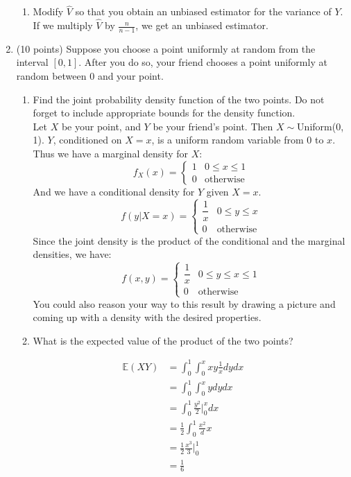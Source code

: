 \documentclass[12pt]{article}
\def\E{{\mathbb E}}
\begin{document}
\begin{enumerate}
\begin{enumerate}
\item Modify $\hat{V}$ so that you obtain an unbiased estimator for the variance of $Y$.\\

If we multiply $\hat{V}$ by $\frac{n}{n-1}$, we get an unbiased estimator.
\end{enumerate}
\pagebreak 

\item (10 points) Suppose you choose a point uniformly at random from the interval $[0, 1]$. After you do so, your friend chooses a point uniformly at random between 0 and your point.
\begin{enumerate}
\item Find the joint probability density function of the two points. Do not forget to include appropriate bounds for the density function.\\

Let $X$ be your point, and $Y$ be your friend's point. Then $X \sim $Uniform(0, 1). $Y$, conditioned on $X = x$, is a uniform random variable from $0$ to $x$. Thus we have a marginal density for $X$:
\[
f_X(x) = \begin{cases}
1 & 0 \leq x \leq 1 \\
0 & \text{otherwise}
\end{cases}
\]
And we have a conditional density for $Y$ given $X = x$.
\[
f(y|X=x) = \begin{cases}
\dfrac{1}{x} & 0 \leq y \leq x \\
0 & \text{otherwise}
\end{cases}
\]
Since the joint density is the product of the conditional and the marginal densities, we have:
\[
f(x, y) = \begin{cases}
\dfrac{1}{x} & 0 \leq y \leq x \leq 1 \\
0 & \text{otherwise}
\end{cases}
\]
You could also reason your way to this result by drawing a picture and coming up with a density with the desired properties.
\item What is the expected value of the product of the two points?
\end{enumerate}
\begin{align*}
\E(XY) &= \int_0^1 \int_0^x xy \frac{1}{x} dy dx \\
&= \int_0^1 \int_0^x y dy dx \\
&= \int_0^1 \frac{y^2}{2}\Bigr|_0^x dx\\
&= \frac{1}{2} \int_0^1 \frac{x^2} dx \\
&= \frac{1}{2} \frac{x^3}{3}\Bigr|_0^1 \\
&= \frac{1}{6}
\end{align*}


\end{enumerate}
\end{document}
